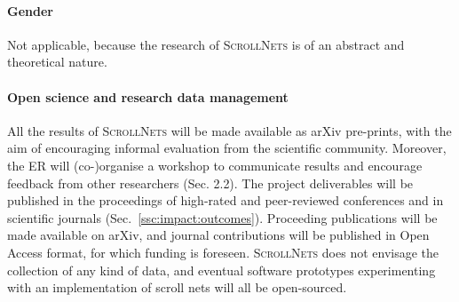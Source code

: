 \documentclass[12pt,draftproposal]{msca-pf}
\newcommand{\proj}{\small\textsc{ScrollNets}}
\begin{document}
\paragraph{Gender}
Not applicable, because the research of {\proj} is of an abstract and theoretical nature.

\paragraph{Open science and research data management}
All the results of {\proj} will be made available as arXiv pre-prints, with the aim of encouraging
informal evaluation from the scientific community. Moreover, the ER will (co-)organise a workshop to
communicate results and encourage feedback from other researchers (Sec. 2.2). The project
deliverables will be published in the proceedings of high-rated and peer-reviewed conferences and in
scientific journals (Sec.~\ref{ssc:impact:outcomes}). Proceeding publications will be made
available on arXiv, and journal contributions will be published in Open Access format, for which
funding is foreseen. {\proj} does not envisage the collection of any kind of data, and eventual
software prototypes experimenting with an implementation of scroll nets will all be open-sourced.




\end{document}
